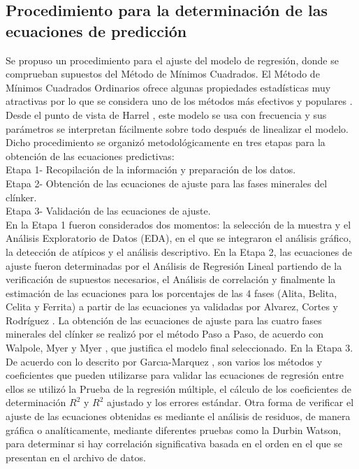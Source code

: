 \documentclass[spanish]{report}
\begin{document}
\subsection{Procedimiento para la determinación de las ecuaciones de predicción}
Se propuso un procedimiento para el ajuste del modelo de regresión, donde se comprueban supuestos del Método de Mínimos Cuadrados. El Método de Mínimos Cuadrados Ordinarios ofrece algunas propiedades estadísticas muy atractivas por lo que se considera uno de los métodos más efectivos y populares \cite{damodar2010econometria}. Desde el punto de vista de Harrel \cite{harrell2012regression}, este modelo se usa con frecuencia y sus parámetros se interpretan fácilmente sobre todo después de linealizar el modelo. Dicho procedimiento se organizó metodológicamente en tres etapas para la obtención de las ecuaciones predictivas:\\
Etapa 1- Recopilación de la información y preparación de los datos. \\
Etapa 2- Obtención de las ecuaciones de ajuste para las fases minerales del clínker. \\
Etapa 3- Validación de las ecuaciones de ajuste.\\
En la Etapa 1 fueron considerados dos momentos: la selección de la muestra y el Análisis Exploratorio de Datos (EDA), en el que se integraron el análisis gráfico, la detección de atípicos y el análisis descriptivo. En la Etapa 2, las ecuaciones de ajuste fueron determinadas por el Análisis de Regresión Lineal partiendo de la verificación de supuestos necesarios, el Análisis de correlación y finalmente la estimación de las ecuaciones para los porcentajes de las 4 fases (Alita, Belita, Celita y Ferrita) a partir de las ecuaciones ya validadas por Alvarez, Cortes y Rodríguez \cite{alvarez2019ecuaciones}. La obtención de las ecuaciones de ajuste para las cuatro fases minerales del clínker se realizó por el método Paso a Paso, de acuerdo con Walpole, Myer y Myer \cite{walpole1999probabilidad}, que justifica el modelo final seleccionado. En la Etapa 3. De acuerdo con lo descrito por Garcıa-Marquez \cite{garcia2003automatic}, son varios los métodos y coeficientes que pueden utilizarse para validar las ecuaciones de regresión entre ellos se utilizó la Prueba de la regresión múltiple, el cálculo de los coeficientes de determinación $R^2$ y $R^2$ ajustado y los errores estándar. Otra forma de verificar el ajuste de las ecuaciones obtenidas es mediante el análisis de residuos, de manera gráfica o analíticamente, mediante diferentes pruebas como la Durbin Watson, para determinar si hay correlación significativa basada en el orden en el que se presentan en el archivo de datos.
\end{document}
